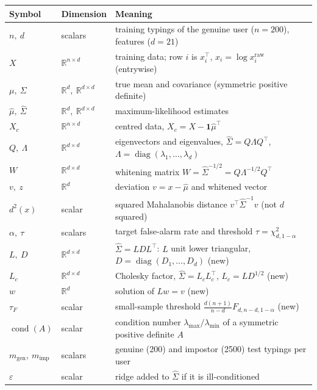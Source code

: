 \documentclass[11pt]{article}
\theoremstyle{definition}
\newcommand{\R}{\mathbb{R}}
\newcommand{\T}{^{\top}}
\newcommand{\diag}{\operatorname{diag}}
\begin{document}
\begin{center}
\small
\begin{tabular}{@{}lll@{}}
\toprule
Symbol & Dimension & Meaning \\
\midrule
$n,\ d$ & scalars & training typings of the genuine user ($n=200$), features ($d=21$) \\
$X$ & $\R^{n\times d}$ & training data; row $i$ is $x_i\T$, $x_i=\log x_i^{\text{raw}}$ (entrywise) \\
$\mu,\ \Sigma$ & $\R^d,\ \R^{d\times d}$ & true mean and covariance (symmetric positive definite) \\
$\hat\mu,\ \hat\Sigma$ & $\R^d,\ \R^{d\times d}$ & maximum-likelihood estimates \\
$X_c$ & $\R^{n\times d}$ & centred data, $X_c=X-\mathbf 1\hat\mu\T$ \\
$Q,\ \Lambda$ & $\R^{d\times d}$ & eigenvectors and eigenvalues, $\hat\Sigma=Q\Lambda Q\T$, $\Lambda=\diag(\lambda_1,\dots,\lambda_d)$ \\
$W$ & $\R^{d\times d}$ & whitening matrix $W=\hat\Sigma^{-1/2}=Q\Lambda^{-1/2}Q\T$ \\
$v,\ z$ & $\R^d$ & deviation $v=x-\hat\mu$ and whitened vector \\
$d^2(x)$ & scalar & squared Mahalanobis distance $v\T\hat\Sigma^{-1}v$ (not $d$ squared) \\
$\alpha,\ \tau$ & scalars & target false-alarm rate and threshold $\tau=\chi^2_{d,1-\alpha}$ \\
$L,\ D$ & $\R^{d\times d}$ & $\hat\Sigma=LDL\T$: $L$ unit lower triangular, $D=\diag(D_1,\dots,D_d)$ (new) \\
$L_c$ & $\R^{d\times d}$ & Cholesky factor, $\hat\Sigma=L_cL_c\T$, $L_c=LD^{1/2}$ (new) \\
$w$ & $\R^d$ & solution of $Lw=v$ (new) \\
$\tau_F$ & scalar & small-sample threshold $\frac{d(n+1)}{n-d}F_{d,n-d,1-\alpha}$ (new) \\
$\operatorname{cond}(A)$ & scalar & condition number $\lambda_{\max}/\lambda_{\min}$ of a symmetric positive definite $A$ \\
$m_{\text{gen}},\ m_{\text{imp}}$ & scalars & genuine (200) and impostor (2500) test typings per user \\
$\varepsilon$ & scalar & ridge added to $\hat\Sigma$ if it is ill-conditioned \\
\bottomrule
\end{tabular}
\end{center}
\end{document}
